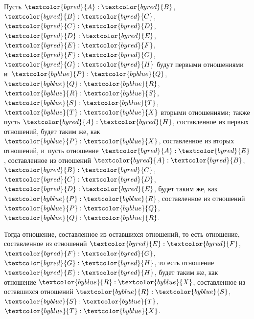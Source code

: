 \documentclass[letters,booklanguage=russian]{byrnebook}
\begin{document}
\vfill\pagebreak

\def\varA{\textcolor{byred}{A}}
\def\varB{\textcolor{byred}{B}}
\def\varC{\textcolor{byred}{C}}
\def\varD{\textcolor{byred}{D}}
\def\varE{\textcolor{byred}{E}}
\def\varF{\textcolor{byred}{F}}
\def\varG{\textcolor{byred}{G}}
\def\varH{\textcolor{byred}{H}}
\def\varP{\textcolor{byblue}{P}}
\def\varQ{\textcolor{byblue}{Q}}
\def\varR{\textcolor{byblue}{R}}
\def\varS{\textcolor{byblue}{S}}
\def\varT{\textcolor{byblue}{T}}
\def\varX{\textcolor{byblue}{X}}

\marginpar{
~\hfill\fbox{\parbox{0.5\marginparwidth}{\centering
~$\varA\ \varB\ \varC\ \varD\ \varE\ \varF\ \varG\ \varH$~\\
~$\varP\ \varQ\ \varR\ \varS\ \varT\ \varX$~\\
}}\hfill~}
Пусть $\varA : \varB$, $\varB : \varC$, $\varC : \varD$, $\varD : \varE$, $\varE : \varF$, $\varF : \varG$, $\varG : \varH$ будут первыми отношениями и~$\varP : \varQ$, $\varQ : \varR$, $\varR : \varS$, $\varS : \varT$, $\varT : \varX$ вторыми отношениями; также пусть $\varA : \varH$, составленное из первых отношений, будет таким же, как $\varP : \varX$, составленное из вторых отношений, и~пусть отношение $\varA : \varE$, составленное из отношений $\varA : \varB$, $\varB : \varC$, $\varC : \varD$, $\varD : \varE$, будет таким же, как $\varP : \varR$, составленное из отношений $\varP : \varQ$, $\varQ : \varR$.

Тогда отношение, составленное из оставшихся отношений, то есть отношение, составленное из отношений $\varE : \varF$, $\varF : \varG$, $\varG : \varH$, то есть отношение $\varE : \varH$, будет таким же, как отношение $\varR : \varX$, составленное из оставшихся отношений $\varR : \varS$, $\varS : \varT$, $\varT : \varX$.
\end{document}
